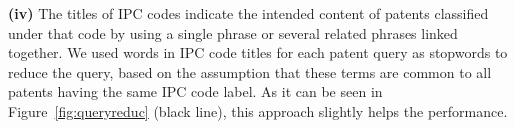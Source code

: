 \vspace*{0.5mm}
\noindent \textbf{(iv)} The titles of IPC codes indicate the intended content of patents classified under that code by using a single phrase or several related phrases linked together. We used words in IPC code titles for each patent query as stopwords to reduce the query, based on the assumption that these terms are common to all patents having the same IPC code label.  As it can be seen in Figure~\ref{fig:queryreduc} (black line), this approach slightly helps the performance.
%
%
%

